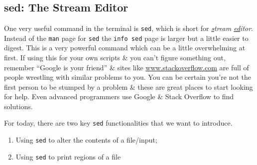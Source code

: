 
\chapter{\moduleTitle}
\newpage

\section{sed: The Stream Editor}
\begin{information}
One very useful command in the terminal is \texttt{sed}, which is short for \textit{\underline{s}tream \underline{ed}itor}.
Instead of the \texttt{man} page for \texttt{sed} the \texttt{info sed} page is larger but a little easier to digest.
This is a very powerful command which can be a little overwhelming at first.
If using this for your own scripts \& you can't figure something out, remember ``Google is your friend'' \& sites like \url{www.stackoverflow.com} are full of people wrestling with similar problems to you.
You can be certain you're not the first person to be stumped by a problem \& these are great places to start looking for help. 
Even advanced programmers use Google \& Stack Overflow to find solutions.\\
\end{information}

For today, there are two key \texttt{sed} functionalities that we want to introduce.\\
\begin{enumerate}
\item Using \texttt{sed} to alter the contents of a file/input;
\item Using \texttt{sed} to print regions of a file
\end{enumerate}

